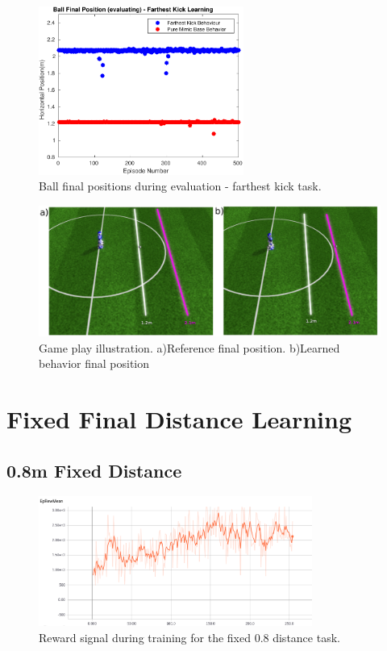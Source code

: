 \begin{figure}[H]
    \centering
    \includegraphics[width=0.6\textwidth]{Chapter7/plots/plot_ball_pos_far_kick_eval.pdf} 
    \caption{Ball final positions during evaluation - farthest kick task.}
    \label{fig:RL_far_kick_pos_eval}
\end{figure}

\begin{figure}[H]
    \centering
    \includegraphics[width=1.0\textwidth]{Chapter7/figures/kick_far.pdf} 
    \caption{Game play illustration. a)Reference final position. b)Learned behavior final position}
    \label{fig:RL_far_kick_roboviz}
\end{figure}

\section{Fixed Final Distance Learning}

\subsection{0.8m Fixed Distance}

\begin{figure}[H]
    \centering
    \includegraphics[width=0.8\textwidth]{Chapter7/figures/rew_mean_fix_08.png} 
    \caption{Reward signal during training for the fixed 0.8 distance task.}
    \label{fig:RL_08_kick}
\end{figure}

